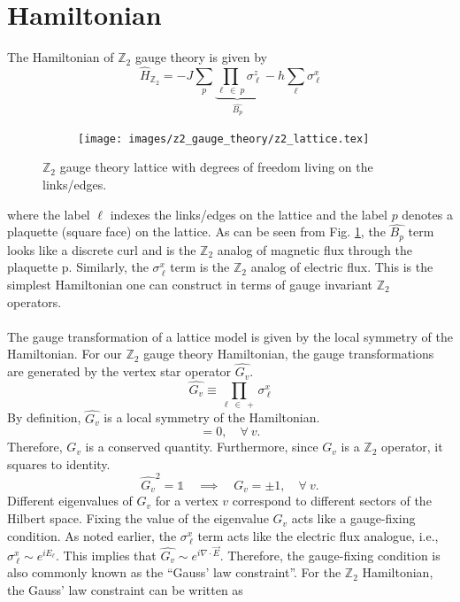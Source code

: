 \documentclass[../thesis_main.tex]{subfiles}
\begin{document}
\section{Hamiltonian}
The Hamiltonian of $\mathbb{Z}_2$ gauge theory is given by 
\begin{equation}
    \hat{H}_{\mathbb{Z}_2} = - J \sum_{p} \underbrace{\prod_{\ell \: \in \: p} \sigma^z_{\: \ell}}_{\hat{B_p}} \: - h \sum_{\ell} \sigma^x_{\: \ell}
\end{equation}
\begin{figure}[!htb]
    \centering
    \begin{subfigure}[b]{0.35\textwidth}  %
        \centering
        \texttt{[image: images/z2\_gauge\_theory/z2\_lattice.tex]}
    \end{subfigure}
    \caption{ $\mathbb{Z}_2$ gauge theory lattice with degrees of freedom living on the links/edges.}
    \label{z2_lattice}
\end{figure}
\!\!\!\!\!\!
where the label $\ell$ indexes the links/edges on the lattice and the label $p$ denotes a plaquette (square face) on the lattice. As can be seen from Fig. \ref{z2_lattice}, the $\hat{B_p}$ term looks like a discrete curl and is the $\mathbb{Z}_2$ analog of magnetic flux through the plaquette p. Similarly, the $\sigma^x_{\: \ell}$ term is the $\mathbb{Z}_2$ analog of electric flux. This is the simplest Hamiltonian one can construct in terms of gauge invariant $\mathbb{Z}_2$ operators.~\\~\\
The gauge transformation of a lattice model is given by the local symmetry of the Hamiltonian. For our $\mathbb{Z}_2$ gauge theory Hamiltonian, the gauge transformations are generated by the vertex star operator $\hat{G_v}$.
\begin{equation}
    \hat{G_v} \equiv \prod_{\ell \: \in \: +} \sigma^x_{\: \ell}
\end{equation}
By definition, $\hat{G_v}$ is a local symmetry of the Hamiltonian. 
\begin{equation}
    [\hat{G_v}, \hat{H}] = 0, \quad \forall \: v.
\end{equation}
Therefore, $G_v$ is a conserved quantity. Furthermore, since $G_v$ is a $\mathbb{Z}_2$ operator, it squares to identity.
\begin{equation}
    \hat{G_v}^2 = \mathds{1} \quad \implies \quad G_v = \pm 1, \quad \forall \: v.
\end{equation}    
Different eigenvalues of $G_v$ for a vertex $v$ correspond to different sectors of the Hilbert space. Fixing the value of the eigenvalue $G_v$ acts like a gauge-fixing condition. As noted earlier, the $\sigma^x_{\: \ell}$ term acts like the electric flux analogue, i.e., $\sigma^x_{\: \ell} \sim e^{iE_\ell}$. This implies that $\hat{G_v} \sim e^{i \nabla \cdot \vec{E}}$. Therefore, the gauge-fixing condition is also commonly known as the ``Gauss' law constraint''. For the $\mathbb{Z}_2$ Hamiltonian, the Gauss' law constraint can be written as 
\end{document}

